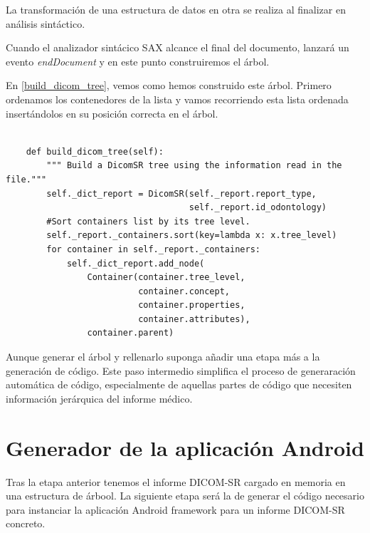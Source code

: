 La transformación de una estructura de datos en otra se realiza al finalizar en análisis sintáctico. \par
Cuando el analizador sintácico SAX alcance el final del documento, lanzará un evento \emph{endDocument} y en este punto construiremos el árbol. \par
En \ref{build_dicom_tree}, vemos como hemos construido este árbol. Primero ordenamos los contenedores de la lista y vamos recorriendo esta lista ordenada insertándolos en su posición correcta en el árbol. \par

\begin{lstlisting}[label=build_dicom_tree,caption=Constructor de un árbol DICOM-SR]

    def build_dicom_tree(self):
        """ Build a DicomSR tree using the information read in the file."""
        self._dict_report = DicomSR(self._report.report_type,
                                    self._report.id_odontology)
        #Sort containers list by its tree level.
        self._report._containers.sort(key=lambda x: x.tree_level)
        for container in self._report._containers:
            self._dict_report.add_node(
                Container(container.tree_level, 
                		  container.concept,
                          container.properties,
                          container.attributes),
                container.parent)
\end{lstlisting}

Aunque generar el árbol y rellenarlo suponga añadir una etapa más a la generación de código. Este paso intermedio simplifica el proceso de generaración automática de código, especialmente de aquellas partes de código que necesiten información jerárquica del informe médico.\par

\section{Generador de la aplicación Android}
Tras la etapa anterior tenemos el informe DICOM-SR cargado en memoria en una estructura de árbool. La siguiente etapa será la de generar el código necesario para instanciar la aplicación Android framework para un informe DICOM-SR concreto.\par

